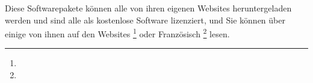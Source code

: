 Diese Softwarepakete können alle von ihren eigenen Websites heruntergeladen werden und sind alle als kostenlose Software lizenziert, und Sie können über einige von ihnen auf den Websites \footnote{\urlFreeSoftwareDirectory{}} oder Französisch \footnote{\urlFramasoftLogiciels{}} lesen.
